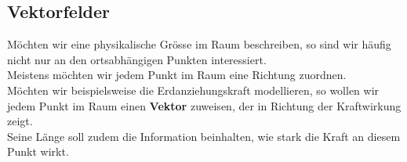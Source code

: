 \iend

\newpage






\subsection{Vektorfelder}
Möchten wir eine physikalische Grösse im Raum beschreiben, so sind wir häufig nicht nur an den ortsabhängigen Punkten interessiert. \\
Meistens möchten wir jedem Punkt im Raum eine Richtung zuordnen. \\
Möchten wir beispielsweise die Erdanziehungskraft modellieren, so wollen wir jedem Punkt im Raum einen \textbf{Vektor} zuweisen, der in Richtung der Kraftwirkung zeigt. \\
Seine Länge soll zudem die Information beinhalten, wie stark die Kraft an diesem Punkt wirkt.










%
%
%
%
%
%
%
%
%
%
%
%
%
%
%
%
%
%
%
%
%
%
%
%

